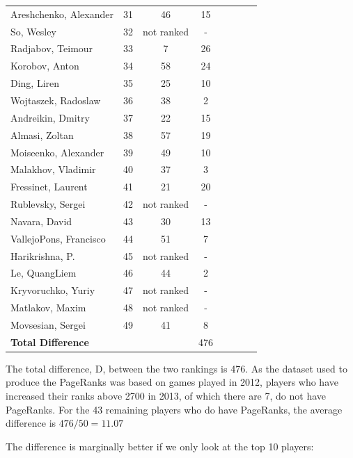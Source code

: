 \documentclass[pdftex,11pt,a4paper]{report}
\begin{document}
\begin{singlespace}
\begin{tabular}{l*{6}{c}r}
Areshchenko, Alexander & 31 & 46 & 15  \\ 
So, Wesley & 32 & not ranked & -  \\ 
Radjabov, Teimour & 33 & 7 & 26  \\ 
Korobov, Anton & 34 & 58 & 24  \\ 
Ding, Liren & 35 & 25 & 10  \\ 
Wojtaszek, Radoslaw & 36 & 38 & 2  \\ 
Andreikin, Dmitry & 37 & 22 & 15  \\ 
Almasi, Zoltan & 38 & 57 & 19  \\ 
Moiseenko, Alexander & 39 & 49 & 10  \\ 
Malakhov, Vladimir & 40 & 37 & 3  \\ 
Fressinet, Laurent & 41 & 21 & 20  \\ 
Rublevsky, Sergei & 42 & not ranked & -  \\ 
Navara, David & 43 & 30 & 13  \\ 
VallejoPons, Francisco & 44 & 51 & 7  \\ 
Harikrishna, P. & 45 & not ranked & -  \\ 
Le, QuangLiem & 46 & 44 & 2  \\ 
Kryvoruchko, Yuriy & 47 & not ranked & -  \\ 
Matlakov, Maxim & 48 & not ranked & -  \\ 
Movsesian, Sergei & 49 & 41 & 8  \\ 
\textbf{Total Difference} & & & 476
\end{tabular}
\end{singlespace}

The total difference, D, between the two rankings is 476. As the dataset used to produce
the PageRanks was based on games played in 2012, players who have increased their ranks
above 2700 in 2013, of which there are 7, do not have PageRanks. For the 43 remaining players
who do have PageRanks, the average difference is $476 / 50 = 11.07$

The difference is marginally better if we only look at the top 10 players:
\end{document}
